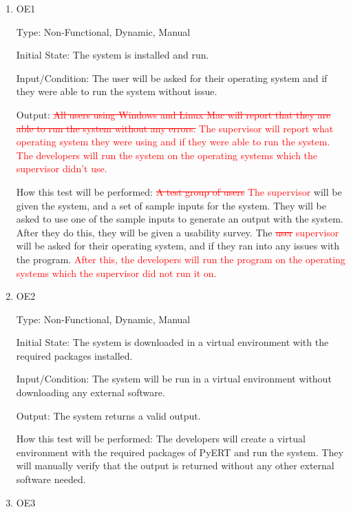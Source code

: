 \documentclass[12pt, titlepage]{article}
\begin{document}
\begin{enumerate}

\item{OE1\\}\label{OE1}

Type: Non-Functional, Dynamic, Manual
					
Initial State: 
The system is installed and run.

Input/Condition: 
The user will be asked for their operating system and if they were able to run the system without issue.

Output: 
\textcolor{red}{\sout{All users using Windows and \textcolor{red}{\sout{Linux} Mac} will report that they are able to run the system without any errors.} The supervisor will report what operating system they were using and if they were able to run the system. The developers will run the system on the operating systems which the supervisor didn't use.}

How this test will be performed: 
\textcolor{red}{\sout{A test group of users} The supervisor} will be given the system, and a set of sample inputs for the system. They will be asked to use one of the sample inputs to generate an output with the system. After they do this, they will be given a usability survey. The \textcolor{red}{\sout{user} supervisor} will be asked for their operating system, and if they ran into any issues with the program. \textcolor{red}{After this, the developers will run the program on the operating systems which the supervisor did not run it on.}
\\
\item{OE2\\}\label{OE2}

Type: Non-Functional, Dynamic, Manual
					
Initial State: 
The system is downloaded in a virtual environment with the required packages installed.

Input/Condition: 
The system will be run in a virtual environment without downloading any external software.

Output: 
The system returns a valid output.

How this test will be performed: 
The developers will create a virtual environment with the required packages of PyERT and run the system. They will manually verify that the output is returned without any other external software needed.
\\
\item{OE3\\}\label{OE3}


\end{enumerate}
\end{document}
